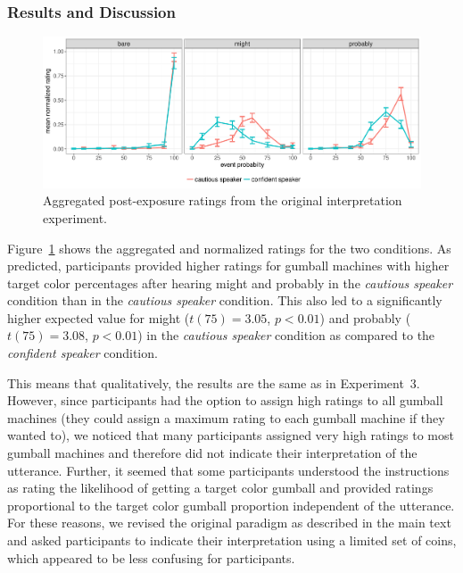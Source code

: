\documentclass[man, floatsintext]{apa6}
\begin{document}
\subsubsection*{Results and Discussion}

\begin{figure}[h!]
\includegraphics[width=\textwidth]{plots/exp-2-ratings.pdf}
\caption{Aggregated post-exposure ratings from the original interpretation experiment.  \label{fig:adaptation-results-comp-orig}}
\end{figure}

Figure~\ref{fig:adaptation-results-comp-orig} shows the aggregated and normalized ratings for the two conditions.  As predicted, participants provided higher ratings for gumball machines with higher target color percentages after hearing {\sc might} and {\sc probably} in the \emph{cautious speaker} condition than in the \emph{cautious speaker} condition. This also led to a significantly higher expected value for {\sc might} ($t(75)=3.05$, $p<0.01$) and {\sc probably} ($t(75)=3.08$, $p<0.01$) in the \emph{cautious speaker} condition as compared to the \emph{confident speaker} condition.

This means that qualitatively, the results are the same as in Experiment~3. However, since participants had the option to assign high 
ratings to 
all gumball machines (they could assign a maximum rating to each gumball machine if they wanted to), we noticed that many participants assigned very high ratings to most gumball 
machines and therefore did not indicate their interpretation of the utterance. Further, it seemed that some participants
understood the instructions as rating the likelihood of getting a target color gumball and provided ratings proportional to the 
target color gumball proportion independent of the utterance. For these reasons, we revised the original paradigm as described
in the main text and asked participants to indicate their interpretation using a limited set of coins, which appeared to be less
confusing for participants. 
\end{document}
